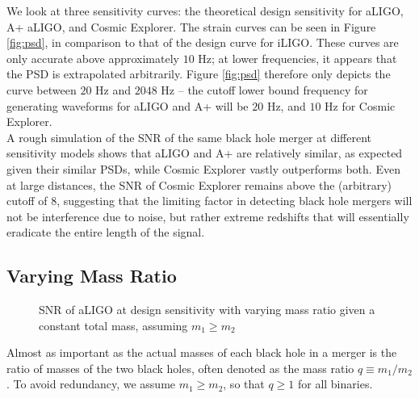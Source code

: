 \documentclass{article}
\begin{document}
We look at three sensitivity curves: the theoretical design sensitivity for aLIGO, A+ aLIGO, and Cosmic Explorer. The strain curves can be seen in Figure \ref{fig:psd}, in comparison to that of the design curve for iLIGO. These curves are only accurate above approximately $10$ Hz; at lower frequencies, it appears that the PSD is extrapolated arbitrarily. Figure \ref{fig:psd} therefore only depicts the curve between $20$ Hz and $2048$ Hz -- the cutoff lower bound frequency for generating waveforms for aLIGO and A+ will be $20$ Hz, and $10$ Hz for Cosmic Explorer. \\

A rough simulation of the SNR of the same black hole merger at different sensitivity models shows that aLIGO and A+ are relatively similar, as expected given their similar PSDs, while Cosmic Explorer vastly outperforms both. Even at large distances, the SNR of Cosmic Explorer remains above the (arbitrary) cutoff of 8, suggesting that the limiting factor in detecting black hole mergers will not be interference due to noise, but rather extreme redshifts that will essentially eradicate the entire length of the signal. 

\subsection{Varying Mass Ratio}

\begin{figure}[!htb]
    \caption{\label{fig:ratiomass} SNR of aLIGO at design sensitivity with varying mass ratio given a constant total mass, assuming $m_1 \geq m_2$}
\end{figure}

Almost as important as the actual masses of each black hole in a merger is the ratio of masses of the two black holes, often denoted as the mass ratio $q \equiv m_1/m_2$. To avoid redundancy, we assume $m_1 \geq m_2$, so that $q \geq 1$ for all binaries. \\
\end{document}
